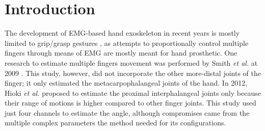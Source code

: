 \documentclass[conference]{IEEEtran}
\begin{document}
\section{Introduction}



The development of EMG-based hand exoskeleton in recent years is mostly limited to grip/grasp gestures \cite{b11}\cite{b12}\cite{b13}, as attempts to proportionally control multiple fingers through means of EMG are 
mostly meant for hand prosthetic. One research to estimate multiple fingers movement was performed by 
Smith \textit{et al.} at 2009 \cite{b14}. This study, however, did not incorporate the other more-distal joints of the finger;
it only estimated the metacarpophalangeal joints of the hand. In 2012, Hioki \textit{et al.} \cite{b15} proposed to estimate 
the proximal interphalangeal joints only because their range of motions is higher compared to other finger 
joints. This study used just four channels to estimate the angle, although compromises came from the 
multiple complex parameters the method needed for its configurations.
\end{document}
